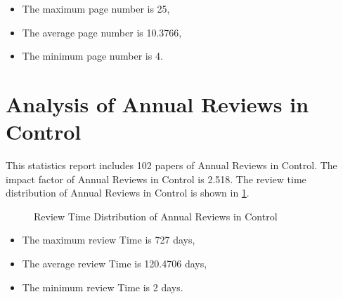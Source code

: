 \documentclass[12pt,
               a4paper,
               journal,
               onecolumn]{IEEEtran}
\begin{document}
\begin{itemize}
  \item The maximum page number is 25,
  \item The average page number is 10.3766,
  \item The minimum page number is 4.
\end{itemize}


\section{Analysis of Annual Reviews in Control}
This statistics report includes 102 papers of Annual Reviews in Control. The impact factor of Annual Reviews in Control is 2.518. The review time distribution of Annual Reviews in Control is shown in \cref{fig:Review Time Distribution of Annual Reviews in Control}.
\begin{figure}[htb]
  \centering
  \caption{Review Time Distribution of Annual Reviews in Control}
  \label{fig:Review Time Distribution of Annual Reviews in Control}
\end{figure}

\begin{itemize}
  \item The maximum review Time is 727 days,
  \item The average review Time is 120.4706 days,
  \item The minimum review Time is 2 days.
\end{itemize}
\end{document}
